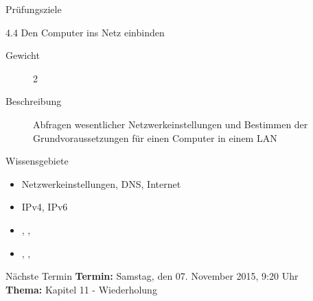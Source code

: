 \documentclass[aspectratio=43]{beamer}
\begin{document}
\begin{frame}{Prüfungsziele}
  \begin{alertblock}{4.4 Den Computer ins Netz einbinden}
    \begin{description}
      \item[Gewicht]  2
      \item[Beschreibung] Abfragen wesentlicher Netzwerkeinstellungen und Bestimmen der 
              Grundvoraussetzungen für einen Computer in einem LAN
    \end{description}
       Wissensgebiete\\ 
        \begin{itemize}
          \item Netzwerkeinstellungen, DNS, Internet
          \item IPv4, IPv6
          \item {}, , 
          \item {}, , 
        \end{itemize}
  \end{alertblock}
\end{frame}
\begin{frame}[plain]
  \begin{alertblock}{Nächste Termin}
    \textbf{Termin:} Samstag, den 07. November 2015, 9:20 Uhr\\
    \textbf{Thema:} Kapitel 11 - Wiederholung\\
  \end{alertblock}
\end{frame}



\materialframe
\end{document}

